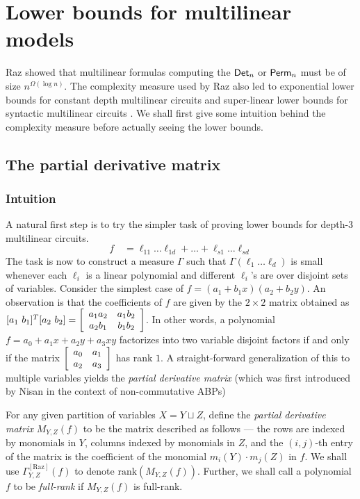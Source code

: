 \documentclass[12pt]{report}
\begin{document}
\chapter{Lower bounds for multilinear models}

Raz \cite{raz2004} showed that multilinear formulas computing the $\mathsf{Det}_n$ or $\mathsf{Perm}_n$ must be of size $n^{\Omega(\log n)}$. The complexity measure used by Raz also led to exponential lower bounds for constant depth multilinear circuits \cite{raz-yehudayoff} and super-linear lower bounds for syntactic multilinear circuits \cite{RSY08}. We shall first give some intuition behind the complexity measure before actually seeing the lower bounds. 

\section{The partial derivative matrix}
\subsection*{Intuition}

A natural first step is to try the simpler task of proving lower bounds for depth-$3$ multilinear circuits. 
$$
f \quad = \ell_{11} \dots \ell_{1d} + \dots + \ell_{s1}\dots \ell_{sd}
$$
The task is now to construct a measure $\Gamma$ such that $\Gamma(\ell_1\dots \ell_d)$ is small whenever each $\ell_i$ is a linear polynomial and different $\ell_i$'s are over disjoint sets of variables. Consider the simplest case of $f = (a_1  + b_1x)(a_2  + b_2y)$. An observation is that the coefficients of $f$ are given by the $2\times 2$ matrix obtained as $[a_1\ b_1]^T [a_2\ b_2] = \left[\begin{array}{cc} a_1a_2 & a_1b_2\\ a_2 b_1 & b_1 b_2\end{array}\right]$. In other words, a polynomial $f = a_0 + a_1x + a_2y + a_3xy$ factorizes into two variable disjoint factors if and only if the matrix $\left[\begin{array}{cc} a_0 & a_1\\ a_2 & a_3\end{array}\right]$ has rank $1$. A straight-forward generalization of this to multiple variables yields the \emph{partial derivative matrix} (which was first introduced by Nisan \cite{nis91} in the context of non-commutative ABPs)\\

\begin{definition}
For any given partition of variables $X = Y \sqcup Z$, define the \emph{partial derivative matrix} $M_{Y,Z}(f)$ to be the matrix described as follows --- the rows are indexed by monomials in $Y$, columns indexed by monomials in $Z$, and the $(i,j)$-th entry of the matrix is the coefficient of the monomial $m_i(Y)\cdot m_j(Z)$ in $f$. We shall use $\Gamma^{\mathrm{[Raz]}}_{Y,Z}(f)$ to denote $\mathrm{rank}(M_{Y,Z}(f))$. Further, we shall call a polynomial $f$ to be \emph{full-rank} if $M_{Y,Z}(f)$ is full-rank.
\end{definition}
\end{document}
